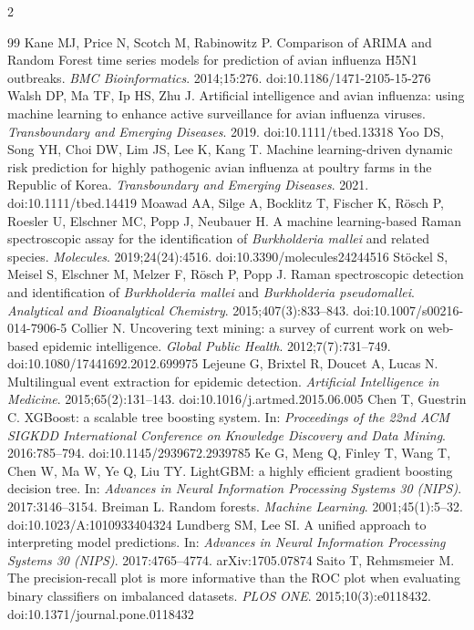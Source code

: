 \documentclass[11pt]{article}
\begin{document}
\begin{multicols}{2}
\begin{thebibliography}{99}
 Kane MJ, Price N, Scotch M, Rabinowitz P. Comparison of ARIMA and Random Forest time series models for prediction of avian influenza H5N1 outbreaks. \emph{BMC Bioinformatics}. 2014;15:276. doi:10.1186/1471-2105-15-276
 Walsh DP, Ma TF, Ip HS, Zhu J. Artificial intelligence and avian influenza: using machine learning to enhance active surveillance for avian influenza viruses. \emph{Transboundary and Emerging Diseases}. 2019. doi:10.1111/tbed.13318
 Yoo DS, Song YH, Choi DW, Lim JS, Lee K, Kang T. Machine learning-driven dynamic risk prediction for highly pathogenic avian influenza at poultry farms in the Republic of Korea. \emph{Transboundary and Emerging Diseases}. 2021. doi:10.1111/tbed.14419
 Moawad AA, Silge A, Bocklitz T, Fischer K, R\"osch P, Roesler U, Elschner MC, Popp J, Neubauer H. A machine learning-based Raman spectroscopic assay for the identification of \emph{Burkholderia mallei} and related species. \emph{Molecules}. 2019;24(24):4516. doi:10.3390/molecules24244516
 St\"ockel S, Meisel S, Elschner M, Melzer F, R\"osch P, Popp J. Raman spectroscopic detection and identification of \emph{Burkholderia mallei} and \emph{Burkholderia pseudomallei}. \emph{Analytical and Bioanalytical Chemistry}. 2015;407(3):833--843. doi:10.1007/s00216-014-7906-5
 Collier N. Uncovering text mining: a survey of current work on web-based epidemic intelligence. \emph{Global Public Health}. 2012;7(7):731--749. doi:10.1080/17441692.2012.699975
 Lejeune G, Brixtel R, Doucet A, Lucas N. Multilingual event extraction for epidemic detection. \emph{Artificial Intelligence in Medicine}. 2015;65(2):131--143. doi:10.1016/j.artmed.2015.06.005
 Chen T, Guestrin C. XGBoost: a scalable tree boosting system. In: \emph{Proceedings of the 22nd ACM SIGKDD International Conference on Knowledge Discovery and Data Mining}. 2016:785--794. doi:10.1145/2939672.2939785
 Ke G, Meng Q, Finley T, Wang T, Chen W, Ma W, Ye Q, Liu TY. LightGBM: a highly efficient gradient boosting decision tree. In: \emph{Advances in Neural Information Processing Systems 30 (NIPS)}. 2017:3146--3154.
 Breiman L. Random forests. \emph{Machine Learning}. 2001;45(1):5--32. doi:10.1023/A:1010933404324
 Lundberg SM, Lee SI. A unified approach to interpreting model predictions. In: \emph{Advances in Neural Information Processing Systems 30 (NIPS)}. 2017:4765--4774. arXiv:1705.07874
 Saito T, Rehmsmeier M. The precision-recall plot is more informative than the ROC plot when evaluating binary classifiers on imbalanced datasets. \emph{PLOS ONE}. 2015;10(3):e0118432. doi:10.1371/journal.pone.0118432

\end{thebibliography}
\end{multicols}
\end{document}
